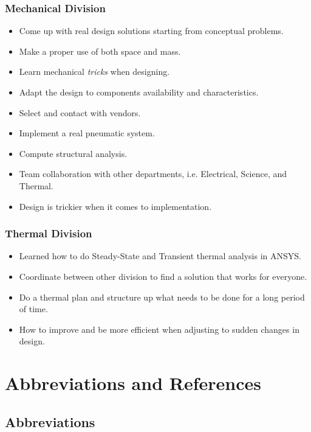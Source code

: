 \documentclass[a4paper,12pt,twoside]{article}
\begin{document}
\subsubsection{Mechanical Division}

\begin{itemize}
    \item Come up with real design solutions starting from conceptual problems.
    \item Make a proper use of both space and mass.
    \item Learn mechanical \textit{tricks} when designing. 
    \item Adapt the design to components availability and characteristics.
    \item Select and contact with vendors.
    \item Implement a real pneumatic system. 
    \item Compute structural analysis. 
    \item Team collaboration with other departments, i.e. Electrical, Science, and Thermal.
    \item Design is trickier when it comes to implementation.
\end{itemize}

\subsubsection{Thermal Division}
\begin{itemize}
    \item Learned how to do Steady-State and Transient thermal analysis in ANSYS.
    \item Coordinate between other division to find a solution that works for everyone.
    \item Do a thermal plan and structure up what needs to be done for a long period of time.
    \item How to improve and be more efficient when adjusting to sudden changes in design.
\end{itemize}
\pagebreak
\section{Abbreviations and References}

\subsection{Abbreviations}
\end{document}

